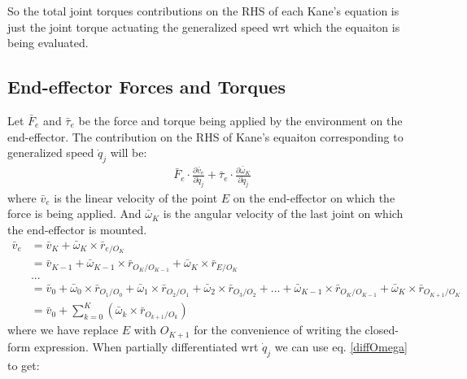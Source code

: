 \documentclass[a4paper,10pt]{article}
\begin{document}
So the total joint torques contributions on the RHS of each Kane's equation is just the joint torque actuating the generalized speed wrt
which the equaiton is being evaluated.

\subsection{End-effector Forces and Torques}
Let $\bar{F}_{e}$ and $\bar\tau_{e}$ be the force and torque being applied by the environment on the end-effector. The contribution on the 
RHS of Kane's equaiton corresponding to generalized speed $\dot{q}_j$ will be:
\begin{align}
 \bar{F}_{e} \cdot \frac{\partial \bar{v}_e}{\partial \dot{q}_j} + \bar\tau_{e} \cdot \frac{\partial \bar\omega_K}{\partial \dot{q}_j} \label{endEff1}
\end{align}
where $\bar{v}_e$ is the linear velocity of the point $E$ on the end-effector on which the force is being applied. And $\bar\omega_K$ is the angular velocity
of the last joint on which the end-effector is mounted.
\begin{align}
 \bar{v}_e &= \bar{v}_K + \bar\omega_K \times \bar{r}_{e/O_{K}} \nonumber \\
 &= \bar{v}_{K-1} + \bar\omega_{K-1} \times \bar{r}_{O_{K}/O_{K-1}} + \bar\omega_K \times \bar{r}_{E/O_{K}} \nonumber \\
 &...  \nonumber \\
 &= \bar{v}_0 + \bar\omega_0 \times \bar{r}_{O_1/O_0} + \bar\omega_1 \times \bar{r}_{O_2/O_1} + \bar\omega_2 \times \bar{r}_{O_3/O_2} + ... + \bar\omega_{K-1} \times \bar{r}_{O_{K}/O_{K-1}} + \bar\omega_K \times \bar{r}_{O_{K+1}/O_{K}} \nonumber \\
 &= \bar{v}_0 + \sum\limits_{k=0}^K \left( \bar\omega_k \times \bar{r}_{O_{k+1}/O_k} \right)
\end{align}
where we have replace $E$ with $O_{K+1}$ for the convenience of writing the closed-form expression. When partially differentiated wrt $\dot{q}_j$ 
we can use eq. \ref{diffOmega} to get:
\end{document}
